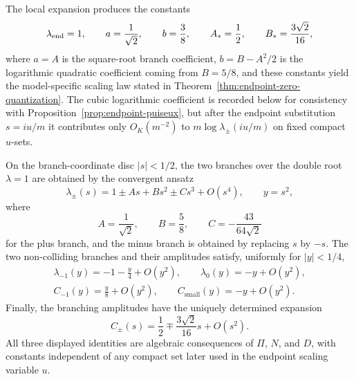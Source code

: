 The local expansion produces the constants
\begin{equation}\label{eq:appendix-cosine-constants}
\lambda_{\mathrm{end}}=1,\qquad
a=\frac{1}{\sqrt2},\qquad
b=\frac38,\qquad
A_*=\frac12,\qquad
B_*=\frac{3\sqrt2}{16},
\end{equation}
where \(a=A\) is the square-root branch coefficient, \(b=B-A^2/2\) is the logarithmic quadratic coefficient coming from \(B=5/8\), and these constants yield the model-specific scaling law stated in Theorem~\ref{thm:endpoint-zero-quantization}.  The cubic logarithmic coefficient is recorded below for consistency with Proposition~\ref{prop:endpoint-puiseux}, but after the endpoint substitution \(s=iu/m\) it contributes only \(O_K(m^{-2})\) to \(m\log\lambda_\pm(iu/m)\) on fixed compact \(u\)-sets.

\begin{lemma}\label{lem:endpoint-coefficient-computation}
On the branch-coordinate disc \(|s|<1/2\), the two branches over the double root \(\lambda=1\) are obtained by the convergent ansatz
\[
\lambda_\pm(s)=1\pm As+Bs^2\pm Cs^3+O(s^4),
\qquad y=s^2,
\]
where
\[
A=\frac1{\sqrt2},
\qquad
B=\frac58,
\qquad
C=-\frac{43}{64\sqrt2}
\]
for the plus branch, and the minus branch is obtained by replacing \(s\) by \(-s\).
The two non-colliding branches and their amplitudes satisfy, uniformly for \(|y|<1/4\),
\begin{gather*}
\lambda_{-1}(y)=-1-\frac y4+O(y^2),
\qquad
\lambda_0(y)=-y+O(y^2),\\
C_{-1}(y)=\frac y8+O(y^2),
\qquad
C_{\mathrm{small}}(y)=-y+O(y^2).
\end{gather*}
Finally, the branching amplitudes have the uniquely determined expansion
\[
C_\pm(s)=\frac12\mp\frac{3\sqrt2}{16}s+O(s^2).
\]
All three displayed identities are algebraic consequences of \(\Pi\), \(N\), and \(D\), with constants independent of any compact set later used in the endpoint scaling variable \(u\).
\end{lemma}

